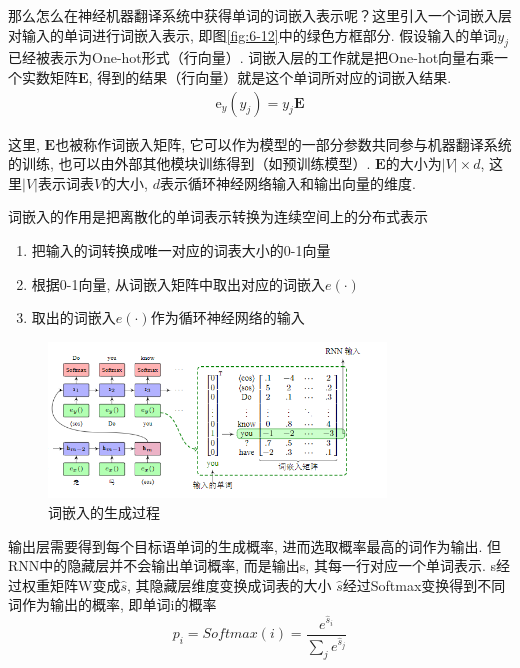 \documentclass[a4paper]{article}
\theoremstyle{definition}
\numberwithin{equation}{section}
\newcommand{\parinterval}{\noindent\hspace{2em}}%
\begin{document}
    \parinterval 那么怎么在神经机器翻译系统中获得单词的词嵌入表示呢？这里引入一个词嵌入层对输入的单词进行词嵌入表示, 即图\ref{fig:6-12}中的绿色方框部分. 假设输入的单词$y_j$已经被表示为One-hot形式（行向量）. 词嵌入层的工作就是把One-hot向量右乘一个实数矩阵$\mathbf{E}$, 得到的结果（行向量）就是这个单词所对应的词嵌入结果. 
    \begin{eqnarray}
    \textrm{e}_y (y_j) = y_j \mathbf{E} 
    \end{eqnarray} 

    \noindent 这里, $\mathbf{E}$也被称作词嵌入矩阵, 它可以作为模型的一部分参数共同参与机器翻译系统的训练, 也可以由外部其他模块训练得到（如预训练模型）. $\mathbf{E}$的大小为$|V| \times d$, 这里$|V|$表示词表$V$的大小, $d$表示循环神经网络输入和输出向量的维度. 
    

    词嵌入的作用是把离散化的单词表示转换为连续空间上的分布式表示
    \begin{enumerate}
        \item   把输入的词转换成唯一对应的词表大小的0-1向量
        \item 根据0-1向量, 从词嵌入矩阵中取出对应的词嵌入$e(\cdot)$
        \item 取出的词嵌入$e(\cdot)$作为循环神经网络的输入
    \end{enumerate} 
  
    
    
\begin{figure}[htp]
    \centering
    \includegraphics[width=0.8\textwidth]{NMLEmbed.png}
    \caption{词嵌入的生成过程}
 
    \end{figure}

输出层需要得到每个目标语单词的生成概率, 进而选取概率最高的词作为输出. 但RNN中的隐藏层并不会输出单词概率, 而是输出s, 其每一行对应一个单词表示.
s经过权重矩阵W变成$\hat{s}$, 其隐藏层维度变换成词表的大小
$\hat{s}$经过Softmax变换得到不同词作为输出的概率, 即单词i的概率
$$p_i= Softmax(i) = \frac{{e^{\hat{s}_i}}}{{\sum_j e^{\hat{s}_j}}}$$
 
\end{document}
